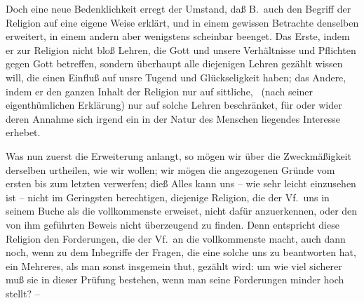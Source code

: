 Doch eine neue Bedenklichkeit erregt der Umstand, daß B.\ auch den Begriff der Religion auf eine eigene Weise erklärt, und in einem gewissen Betrachte denselben erweitert, in einem andern aber wenigstens scheinbar beenget. Das Erste, indem er zur Religion nicht bloß Lehren, die Gott und unsere Verhältnisse und Pflichten gegen Gott betreffen, sondern überhaupt alle diejenigen Lehren gezählt wissen will, die einen Einfluß auf unsre Tugend und Glückseligkeit haben; das Andere, indem er den ganzen Inhalt der Religion nur auf sittliche, \dh\  (nach seiner eigenthümlichen Erklärung) nur auf solche Lehren beschränket, für oder wider deren Annahme sich irgend ein in der Natur des Menschen liegendes Interesse erhebet. \par 
Was nun zuerst die Erweiterung anlangt, so mögen wir über die Zweckmäßigkeit derselben urtheilen, wie wir wollen; wir mögen die  angezogenen Gründe vom ersten bis zum letzten verwerfen; dieß Alles kann uns -- wie sehr leicht einzusehen ist -- nicht im Geringsten berechtigen, diejenige Religion, die der Vf.\ uns in seinem Buche als die vollkommenste erweiset, nicht dafür anzuerkennen, oder den von ihm geführten Beweis nicht überzeugend zu finden. Denn entspricht diese Religion den Forderungen, die der Vf.\ an die vollkommenste macht, auch dann noch, wenn zu dem Inbegriffe der Fragen, die eine solche uns zu beantworten hat, ein Mehreres, als man sonst insgemein thut, gezählt wird: um wie viel sicherer muß sie in dieser Prüfung bestehen, wenn man seine Forderungen minder hoch stellt? --\par 
